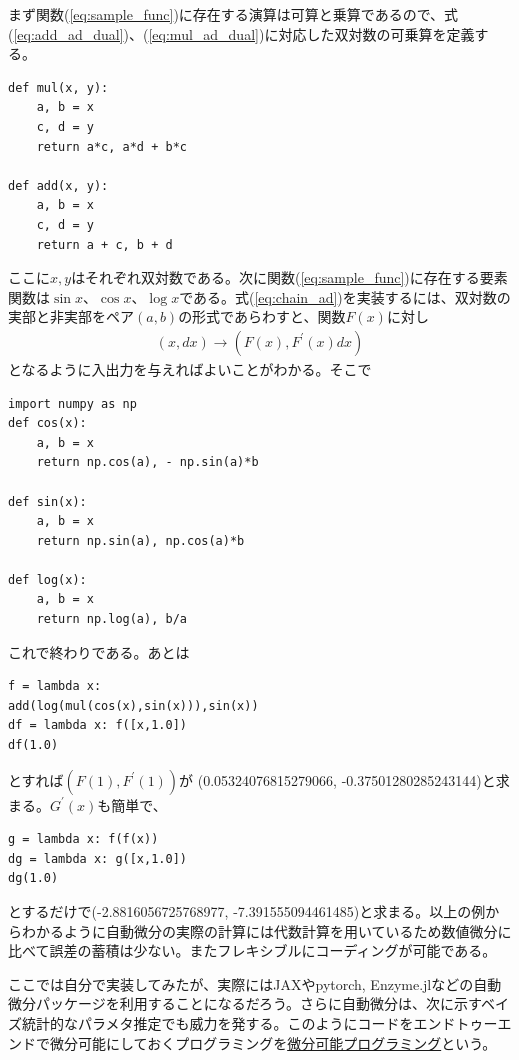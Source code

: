 まず関数(\ref{eq:sample_func})に存在する演算は可算と乗算であるので、式(\ref{eq:add_ad_dual})、(\ref{eq:mul_ad_dual})に対応した双対数の可乗算を定義する。
\begin{verbatim}
def mul(x, y):
    a, b = x
    c, d = y
    return a*c, a*d + b*c

def add(x, y):
    a, b = x
    c, d = y
    return a + c, b + d
\end{verbatim}
ここに$x,y$はそれぞれ双対数である。次に関数(\ref{eq:sample_func})に存在する要素関数は$\sin{x}$、$\cos{x}$、$\log{x}$である。式(\ref{eq:chain_ad})を実装するには、双対数の実部と非実部をペア$(a,b)$の形式であらわすと、関数$F(x)$に対し
\begin{eqnarray}
(x,dx) \to (F(x),F^\prime(x) dx) 
\end{eqnarray}
となるように入出力を与えればよいことがわかる。そこで
\begin{verbatim}
import numpy as np
def cos(x):
    a, b = x
    return np.cos(a), - np.sin(a)*b

def sin(x):
    a, b = x
    return np.sin(a), np.cos(a)*b
    
def log(x):
    a, b = x
    return np.log(a), b/a 
\end{verbatim}
これで終わりである。あとは

\begin{verbatim}
f = lambda x: 
add(log(mul(cos(x),sin(x))),sin(x))
df = lambda x: f([x,1.0])
df(1.0)
\end{verbatim}
とすれば$(F(1), F^\prime(1))$が (0.05324076815279066, -0.37501280285243144)と求まる。$G^\prime(x)$も簡単で、
\begin{verbatim}
g = lambda x: f(f(x))
dg = lambda x: g([x,1.0])
dg(1.0)
\end{verbatim}
とするだけで(-2.8816056725768977, -7.391555094461485)と求まる。以上の例からわかるように自動微分の実際の計算には代数計算を用いているため数値微分に比べて誤差の蓄積は少ない。またフレキシブルにコーディングが可能である。

ここでは自分で実装してみたが、実際にはJAXやpytorch, Enzyme.jlなどの自動微分パッケージを利用することになるだろう。さらに自動微分は、次に示すベイズ統計的なパラメタ推定でも威力を発する。このようにコードをエンドトゥーエンドで微分可能にしておくプログラミングを\underline{微分可能プログラミング}という\cite{2024arXiv240314606B}。